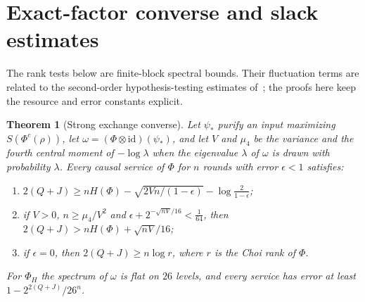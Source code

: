 \documentclass[11pt,a4paper]{article}
\theoremstyle{plain}
\newtheorem{theorem}{Theorem}[section]
\theoremstyle{definition}
\theoremstyle{remark}
\begin{document}
\section{Exact-factor converse and slack estimates}\label{app:exact}

The rank tests below are finite-block spectral bounds. Their fluctuation
terms are related to the second-order hypothesis-testing estimates
of~\cite{TomamichelHayashi2013,Li2014}; the proofs here keep the resource and
error constants explicit.


\begin{theorem}[Strong exchange converse]\label{thm:strong-converse}
Let $\psi_*$ purify an input maximizing $S(\Phi^c(\rho))$, let $\omega=(\Phi\otimes\mathrm{id})(\psi_*)$, and let $V$ and $\mu_4$ be the
variance and the fourth central moment of $-\log\lambda$ when the eigenvalue $\lambda$ of $\omega$ is drawn with probability
$\lambda$. Every causal service of $\Phi$ for $n$ rounds with error $\epsilon<1$ satisfies:
\begin{enumerate}[label=(\alph*)]
\item $2(Q+J)\ge nH(\Phi)-\sqrt{2Vn/(1-\epsilon)}-\log\frac2{1-\epsilon}$;
\item if $V>0$, $n\ge\mu_4/V^2$ and $\epsilon+2^{-\sqrt{nV}/16}<\frac1{64}$, then $2(Q+J)>nH(\Phi)+\sqrt{nV}/16$;
\item if $\epsilon=0$, then $2(Q+J)\ge n\log r$, where $r$ is the Choi rank of $\Phi$.
\end{enumerate}
For $\Phi_H$ the spectrum of $\omega$ is flat on $26$ levels, and every service has error at least $1-2^{2(Q+J)}/26^n$.
\end{theorem}
\end{document}
